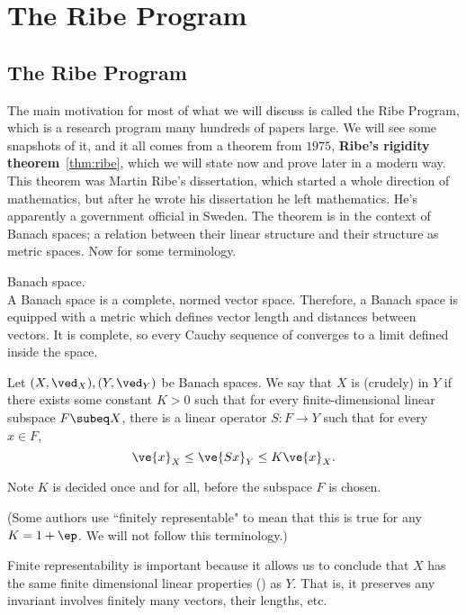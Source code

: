 \chapter{The Ribe Program}



\section{The Ribe Program}

The main motivation for most of what we will discuss is called the Ribe Program, which is a research program many hundreds of papers large. We will see some snapshots of it, and it all comes from a theorem from $1975$, \textbf{Ribe's rigidity theorem}~\ref{thm:ribe}, which we will state now and prove later in a modern way. This theorem was Martin Ribe's dissertation, which started a whole direction of mathematics, but after he wrote his dissertation he left mathematics. He's apparently a government official in Sweden. The theorem is in the context of Banach spaces; a relation between their linear structure and their structure as metric spaces. Now for some terminology. 

\begin{df} Banach space. \\
A Banach space is a complete, normed vector space. Therefore, a Banach space is equipped with a metric which defines vector length and distances between vectors. It is complete, so every Cauchy sequence of converges to a limit defined inside the space. 
\end{df}


\begin{df}
Let $(X,\ved_X), (Y,\ved_Y)$ be Banach spaces. We say that $X$ is (crudely)  in $Y$ if there exists some constant $K>0$ such that for every finite-dimensional linear subspace $F\subeq X$, there is a linear operator $S: F \to Y$ such that for every $x\in F$, 
\[
\ve{x}_X\le \ve{Sx}_Y\le K\ve{x}_X.
\]
\end{df}
Note $K$ is decided once and for all, before the subspace $F$ is chosen.

(Some authors use ``finitely representable" to mean that this is true for any $K=1+\ep$. We will not follow this terminology.)

Finite representability is important because %
it allows us to conclude that $X$ has the same finite dimensional linear properties () as $Y$. That is, it preserves any invariant involves finitely many vectors, their lengths, etc.

